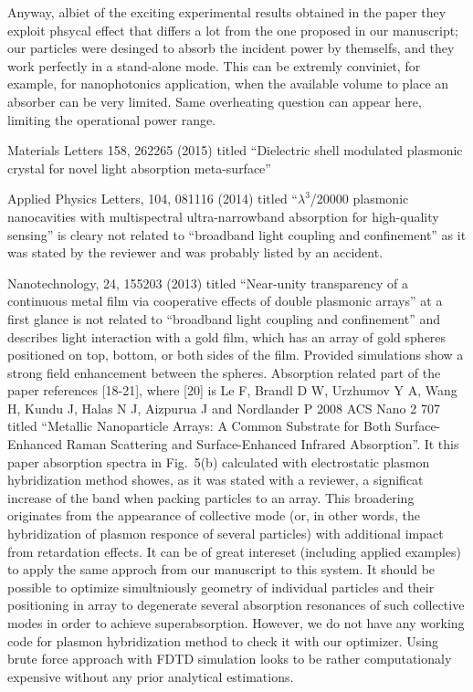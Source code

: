 \documentclass[a4paper]{article}
\begin{document}
Anyway, albiet of the exciting experimental results obtained in the
paper they exploit phsycal effect that differs a lot from the one
proposed in our manuscript; our particles were desinged to absorb the
incident power by themselfs, and they work perfectly in a stand-alone
mode.  This can be extremly conviniet, for example, for nanophotonics
application, when the available volume to place an absorber can be
very limited. Same overheating question can appear here, limiting the
operational power range.


Materials Letters 158, 262265 (2015) titled ``Dielectric shell
modulated plasmonic crystal for novel light absorption meta-surface''

Applied Physics Letters, 104, 081116 (2014) titled ``$\lambda^3$/20000
plasmonic nanocavities with multispectral ultra-narrowband absorption
for high-quality sensing'' is cleary not related to ``broadband light
coupling and confinement'' as it was stated by the reviewer and was
probably listed by an accident.

Nanotechnology, 24, 155203 (2013) titled ``Near-unity transparency of
a continuous metal film via cooperative effects of double plasmonic
arrays'' at a first glance is not related to ``broadband light
coupling and confinement'' and describes light interaction with a gold
film, which has an array of gold spheres positioned on top, bottom, or
both sides of the film.  Provided simulations show a strong field
enhancement between the spheres. Absorption related part of the paper
references [18-21], where [20] is Le F, Brandl D W, Urzhumov Y A, Wang
H, Kundu J, Halas N J, Aizpurua J and Nordlander P 2008 ACS Nano 2 707
titled ``Metallic Nanoparticle Arrays: A Common Substrate for Both
Surface-Enhanced Raman Scattering and Surface-Enhanced Infrared
Absorption''.  It this paper absorption spectra in Fig.~5(b)
calculated with electrostatic plasmon hybridization method showes, as
it was stated with a reviewer, a significat increase of the band when
packing particles to an array. This broadering originates from the
appearance of collective mode (or, in other words, the hybridization
of plasmon responce of several particles) with additional impact from
retardation effects. It can be of great intereset (including applied
examples) to apply the same approch from our manuscript to this
system. It should be possible to optimize simultniously geometry of
individual particles and their positioning in array to degenerate
several absorption resonances of such collective modes in order to
achieve superabsorption. However, we do not have any working code for
plasmon hybridization method to check it with our optimizer. Using
brute force approach with FDTD simulation looks to be rather
computationaly expensive without any prior analytical estimations.
\end{document}
